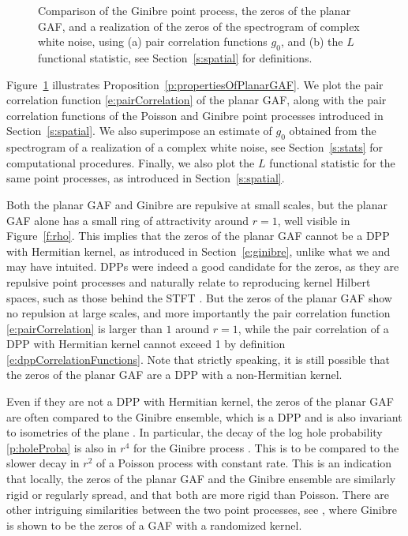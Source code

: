\begin{figure}
\caption{Comparison of the Ginibre point process, the zeros of the planar GAF,
  and a realization of the zeros of the spectrogram of complex white noise, using
  (a) pair correlation functions $g_0$, and (b) the $L$ functional statistic, see Section~\ref{s:spatial} for definitions.}
\label{f:functionalStatistics}
\end{figure}

Figure~\ref{f:functionalStatistics} illustrates
Proposition~\ref{p:propertiesOfPlanarGAF}. We plot the pair correlation function
\eqref{e:pairCorrelation} of the planar GAF, along with the pair correlation
functions of the Poisson and Ginibre point processes introduced in
Section~\ref{s:spatial}. We also superimpose an estimate of $g_0$
obtained from the spectrogram of a realization of a complex white noise, see
Section~\ref{s:stats} for computational procedures. Finally, we also plot the
$L$ functional statistic for the same point processes, as introduced in Section~\ref{s:spatial}.

Both the planar GAF and Ginibre are repulsive at small scales, but the planar
GAF alone has a small ring of attractivity around $r=1$, well visible in
Figure~\ref{f:rho}. This implies that the zeros of the planar GAF cannot be a
DPP with Hermitian kernel, as introduced in
Section~\ref{e:ginibre}, unlike what we and \cite{Fla17} may have intuited. DPPs
were indeed a good candidate for the zeros, as they are repulsive point
processes and naturally relate to reproducing kernel Hilbert spaces, such as
those behind the STFT \cite[Theorem 3.4.2]{Gro01}. But the zeros of the planar
GAF show no repulsion at large scales, and more importantly the pair correlation
function \eqref{e:pairCorrelation} is larger than $1$ around $r=1$, while the
pair correlation of a DPP with Hermitian kernel cannot exceed 1 by definition
\eqref{e:dppCorrelationFunctions}. Note that strictly speaking, it is still
possible that the zeros of the planar GAF are a DPP with a non-Hermitian kernel.

Even if they are not a DPP with Hermitian kernel, the zeros of the planar GAF
are often compared to the Ginibre ensemble, which is a DPP and is also invariant
to isometries of the plane \cite[Section 4.3.7]{HKPV09}. In particular, the decay of the log hole probability \eqref{p:holeProba} is also
in $r^{4}$ for the Ginibre process \cite[Proposition 7.2.1]{HKPV09}. This is to
be compared to the slower decay in $r^2$ of a Poisson process with constant
rate. This is an indication that locally, the zeros of the planar GAF and the
Ginibre ensemble are similarly rigid or regularly spread, and that both are more
rigid than Poisson. There are other intriguing similarities between the two
point processes, see \citep{KrVi14}, where Ginibre is shown to be the zeros of a
GAF with a randomized kernel.

